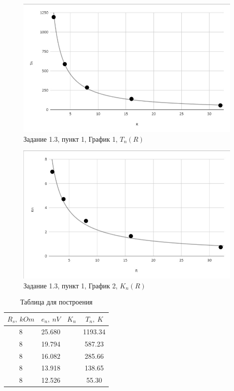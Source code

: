 \documentclass[a4paper, 14pt]{extarticle}%
\begin{document}
\begin{figure}[h!]
			\centering
			\includegraphics[width=1.1\linewidth]{1.3/pic9.jpg}
			\caption{Задание 1.3, пункт 1, График 1, $T_n(R)$}
			\label{A}
\end{figure}

\begin{figure}[h!]
			\centering
			\includegraphics[width=1.1\linewidth]{1.3/pic10.jpg}
			\caption{Задание 1.3, пункт 1, График 2, $K_n(R)$}
			\label{A}
\end{figure}



\begin{table}[h!]
  \caption{Таблица для построения}
  \begin{center}
  	\begin{tabular}{|c|c|c|c|}
  	    \hline
  	$R_s, \: kOm$ & $e_n, \: nV$ & $K_n$ & $T_n, \: K$ \\
  	    \hline
  	8 & 25.680 &  & 1193.34   \\
  		\hline
  	8 & 19.794 &  & 587.23    \\
  		\hline
  	8 & 16.082  &   & 285.66   \\
  		\hline
    8 & 13.918  &   &  138.65   \\
        \hline
    8 & 12.526  &   & 55.30    \\
        \hline
  	\end{tabular}
  \end{center}
\label{B_table}
\end{table}
\end{document}
